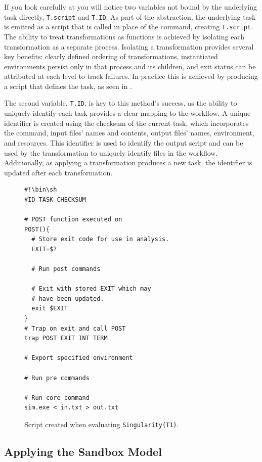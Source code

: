 \documentclass[conference]{IEEEtran}
\begin{document}
If you look carefully at 
you will notice two variables not
bound by the underlying task
directly, {\tt T.script} and {\tt T.ID}.
As part of the abstraction, the 
underlying task is emitted as a script
that is called in place of the command,
creating {\tt T.script}.
The ability to treat transformations as functions 
is achieved by isolating 
each transformation as a separate process.
Isolating a transformation provides 
several key benefits:
clearly defined ordering of transformations,
instantiated environments persist only 
in that process and its children,
and exit status can be attributed 
at each level to track failures.
In practice this is achieved by 
producing a script that
defines the task, as seen in .

The second variable, {\tt T.ID},
is key to this method's success, as 
the ability to uniquely identify
each task provides a clear
mapping to the workflow.
A unique identifier is created
using the checksum of the
current task, which incorporates the
command, input files' names and contents,
output files' names, environment, and
resources. 
This identifier is used to identify the output
script and can be used by the
transformation to uniquely identify 
files in the workflow.
Additionally, as applying a transformation
produces a new task, the identifier 
is updated after each transformation.

\begin{figure}[h]
\begin{framed}
\small
\begin{verbatim}
#!\bin\sh
#ID TASK_CHECKSUM

# POST function executed on 
POST(){
  # Store exit code for use in analysis.
  EXIT=$?
  
  # Run post commands
  
  # Exit with stored EXIT which may
  # have been updated.
  exit $EXIT
}
# Trap on exit and call POST
trap POST EXIT INT TERM

# Export specified environment

# Run pre commands

# Run core command
sim.exe < in.txt > out.txt
\end{verbatim}
\end{framed}
\caption{Script created when evaluating {\tt Singularity(T1)}.}
\label{task-script}
\end{figure}


\subsection{Applying the Sandbox Model}
\end{document}
